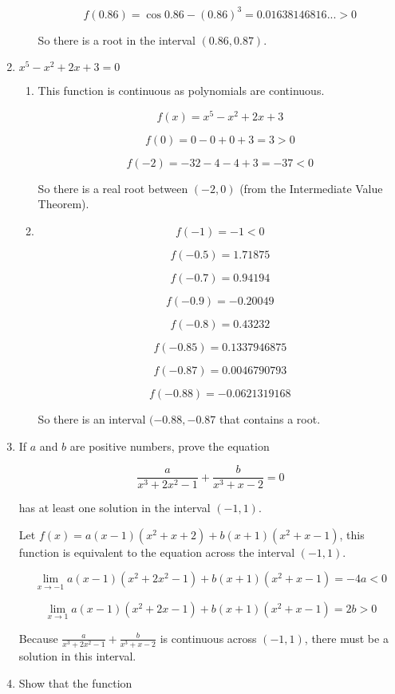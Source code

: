 \documentclass{article}
\begin{document}
\begin{enumerate}
\begin{enumerate}
				$$f(0.86) = \cos 0.86 - (0.86)^3 = 0.01638146816... > 0$$

				So there is a root in the interval $(0.86,0.87)$.
			\end{enumerate}

			\item $x^5 - x^2 + 2x + 3 = 0$

			\begin{enumerate}
				\item

				This function is continuous as polynomials are continuous.

				$$f(x) = x^5 - x^2 + 2x + 3$$

				$$f(0) = 0 - 0 + 0 + 3 = 3 > 0$$

				$$f(-2) = -32 - 4 - 4 + 3 = -37 < 0$$

				So there is a real root between $(-2, 0)$ (from the Intermediate Value
				Theorem).	

				\item

				$$f(-1) = -1 < 0$$

				$$f(-0.5) = 1.71875$$

				$$f(-0.7) = 0.94194$$

				$$f(-0.9) = -0.20049$$

				$$f(-0.8) = 0.43232$$

				$$f(-0.85) = 0.1337946875$$

				$$f(-0.87) = 0.0046790793$$

				$$f(-0.88) = -0.0621319168$$

				So there is an interval $(-0.88, -0.87$ that contains a root.
			\end{enumerate}

			\item If $a$ and $b$ are positive numbers, prove the equation

				$$\frac{a}{x^3+2x^2-1} + \frac{b}{x^3+x-2} = 0$$

				has at least one solution in the interval $(-1,1)$.

				Let $f(x) = a(x-1)(x^2+x+2) + b(x+1)(x^2+x-1)$, this function is
				equivalent to the equation across the interval $(-1,1)$.

				$$\lim \limits _{x \to -1} a(x-1)(x^2+2x^2-1) + b(x+1)(x^2+x-1) = -4a < 0$$

				$$\lim \limits _{x \to 1} a(x-1)(x^2+2x-1) + b(x+1)(x^2+x-1) = 2b > 0$$


				Because $\frac{a}{x^3+2x^2-1} + \frac{b}{x^3+x-2}$ is continuous across $(-1,1)$,
				there must be a solution in this interval.

			\item Show that the function
	\end{enumerate}
\end{document}
